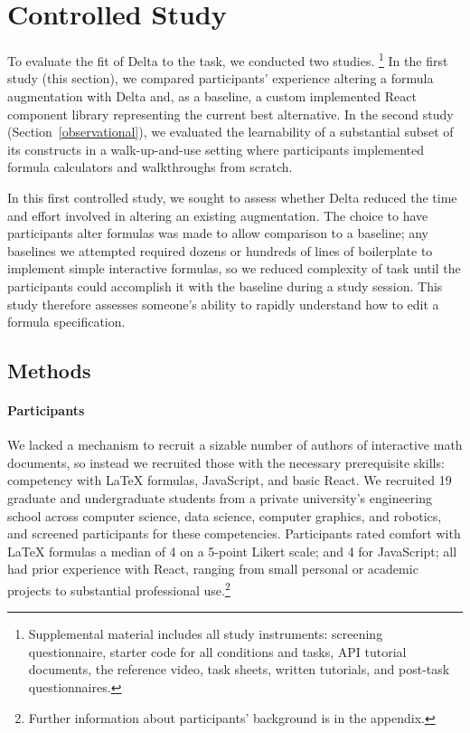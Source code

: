 \section{Controlled Study}\label{results}

To evaluate the fit of Delta to the task, we conducted two studies. \footnote{Supplemental material includes all study instruments: screening questionnaire, starter code for all conditions and tasks, API tutorial documents, the reference video, task sheets, written tutorials, and post-task questionnaires.} In the first study (this section), we compared participants' experience altering a formula augmentation with Delta and, as a baseline, a custom implemented React component library representing the current best alternative. In the second study (Section~\ref{observational}), we evaluated the learnability of a substantial subset of its constructs in a walk-up-and-use setting where participants implemented formula calculators and walkthroughs from scratch.

In this first controlled study, we sought to assess whether Delta reduced the time and effort involved in altering an existing augmentation. The choice to have participants alter formulas was made to allow comparison to a baseline; any baselines we attempted required dozens or hundreds of lines of boilerplate to implement simple interactive formulas, so we reduced complexity of task until the participants could accomplish it with the baseline during a study session. This study therefore assesses someone's ability to rapidly understand how to edit a formula specification.

\subsection{Methods}

\paragraph{Participants} We lacked a mechanism to recruit a sizable number of authors of interactive math documents, so instead we recruited those with the necessary prerequisite skills: competency with LaTeX formulas, JavaScript, and basic React. We recruited 19 graduate and undergraduate students from a private university's engineering school across computer science, data science, computer graphics, and robotics, and screened participants for these competencies. Participants rated comfort with LaTeX formulas a median of 4 on a 5-point Likert scale; and 4 for JavaScript; all had prior experience with React, ranging from small personal or academic projects to substantial professional use.\footnote{Further information about participants' background is in the appendix.}


